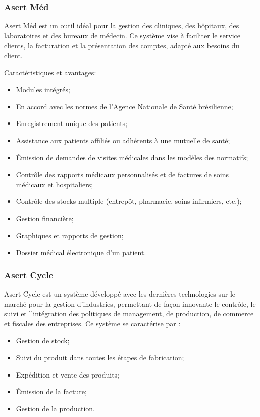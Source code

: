 \subsubsection{Asert Méd}

Asert Méd est un outil idéal pour la gestion des cliniques, des hôpitaux, des laboratoires et des bureaux de médecin. Ce système vise à faciliter le service clients, la facturation et la présentation des comptes, adapté aux besoins du client.

Caractéristiques et avantages:

\begin{itemize}
\item Modules intégrés;
\item En accord avec les normes de l'Agence Nationale de Santé brésilienne;
\item Enregistrement unique des patients;
\item Assistance aux patients affiliés ou adhérents à une mutuelle de santé;
\item Émission de demandes de visites médicales dans les modèles des normatifs;
\item Contrôle des rapports médicaux personnalisés et de factures de soins médicaux et hospitaliers;
\item Contrôle des stocks multiple (entrepôt, pharmacie, soins infirmiers, etc.);
\item Gestion financière;
\item Graphiques et rapports de gestion;
\item Dossier médical électronique d'un patient.
\end{itemize}

\subsubsection{Asert Cycle}

Asert Cycle est un système développé avec les dernières technologies sur le marché pour la gestion d'industries, permettant de façon innovante le contrôle, le suivi et l'intégration des politiques de management, de production, de commerce et fiscales des entreprises. Ce système se caractérise par :

\begin{itemize}
\item Gestion de stock;
\item Suivi du produit dans toutes les étapes de fabrication;
\item Expédition et vente des produits;
\item Émission de la facture;
\item Gestion de la production.
\end{itemize}

